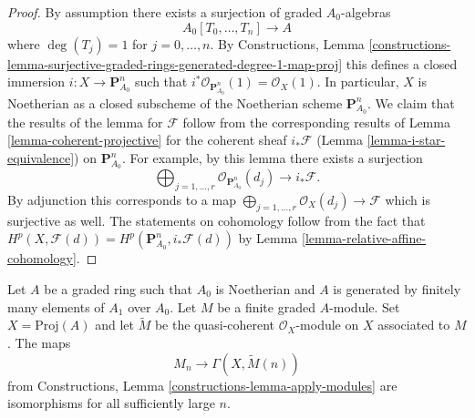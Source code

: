 \begin{proof}
By assumption there exists a surjection of graded $A_0$-algebras
$$
A_0[T_0, \ldots, T_n] \longrightarrow A
$$
where $\deg(T_j) = 1$ for $j = 0, \ldots, n$. By Constructions, Lemma
\ref{constructions-lemma-surjective-graded-rings-generated-degree-1-map-proj}
this defines a closed immersion $i : X \to \mathbf{P}^n_{A_0}$
such that $i^*\mathcal{O}_{\mathbf{P}^n_{A_0}}(1) = \mathcal{O}_X(1)$.
In particular, $X$ is Noetherian as a closed subscheme of the Noetherian
scheme $\mathbf{P}^n_{A_0}$. We claim that the results of the lemma for
$\mathcal{F}$ follow from the corresponding
results of Lemma \ref{lemma-coherent-projective} for the coherent sheaf
$i_*\mathcal{F}$ (Lemma \ref{lemma-i-star-equivalence}) on
$\mathbf{P}^n_{A_0}$. For example, by this lemma there
exists a surjection
$$
\bigoplus\nolimits_{j = 1, \ldots, r} \mathcal{O}_{\mathbf{P}^n_{A_0}}(d_j)
\longrightarrow i_*\mathcal{F}.
$$
By adjunction this corresponds to a map
$\bigoplus_{j = 1, \ldots, r} \mathcal{O}_X(d_j) \longrightarrow \mathcal{F}$
which is surjective as well. The statements on cohomology follow from the
fact that
$H^p(X, \mathcal{F}(d)) = H^p(\mathbf{P}^n_{A_0}, i_*\mathcal{F}(d))$
by Lemma \ref{lemma-relative-affine-cohomology}.
\end{proof}

\begin{lemma}
\label{lemma-recover-tail-graded-module}
Let $A$ be a graded ring such that $A_0$ is Noetherian and $A$ is generated
by finitely many elements of $A_1$ over $A_0$. Let $M$ be a
finite graded $A$-module. Set $X = \text{Proj}(A)$ and let $\widetilde{M}$
be the quasi-coherent $\mathcal{O}_X$-module on $X$ associated to $M$.
The maps
$$
M_n \longrightarrow \Gamma(X, \widetilde{M}(n))
$$
from Constructions, Lemma \ref{constructions-lemma-apply-modules}
are isomorphisms for all sufficiently large $n$.
\end{lemma}

